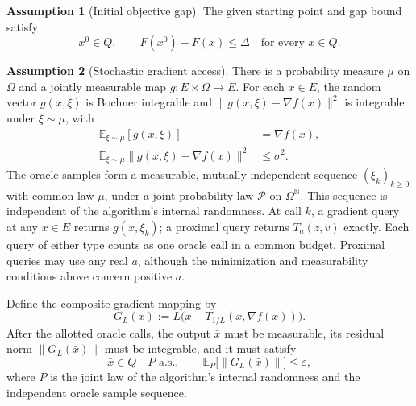 \documentclass[10pt]{article}
\theoremstyle{definition}
\newtheorem{assumption}{Assumption}
\begin{document}
\begin{assumption}[Initial objective gap]
The given starting point and gap bound satisfy
\[
x^0\in Q,
\qquad F(x^0)-F(x)\leq\Delta
\quad\text{for every }x\in Q.
\]
\end{assumption}

\begin{assumption}[Stochastic gradient access]
There is a probability measure $\mu$ on $\Omega$ and a jointly measurable map $g:E\times\Omega\to E$. For each $x\in E$, the random vector $g(x,\xi)$ is Bochner integrable and $\|g(x,\xi)-\nabla f(x)\|^2$ is integrable under $\xi\sim\mu$, with
\[
\begin{aligned}
\mathbb{E}_{\xi\sim\mu}[g(x,\xi)]&=\nabla f(x),\\
\mathbb{E}_{\xi\sim\mu}\|g(x,\xi)-\nabla f(x)\|^2&\leq\sigma^2.
\end{aligned}
\]
The oracle samples form a measurable, mutually independent sequence $(\xi_k)_{k\geq0}$ with common law $\mu$, under a joint probability law $\mathcal{P}$ on $\Omega^{\mathbb{N}}$. This sequence is independent of the algorithm's internal randomness. At call $k$, a gradient query at any $x\in E$ returns $g(x,\xi_k)$; a proximal query returns $T_a(z,v)$ exactly. Each query of either type counts as one oracle call in a common budget. Proximal queries may use any real $a$, although the minimization and measurability conditions above concern positive $a$.
\end{assumption}

Define the composite gradient mapping by
\[
G_L(x):=L\bigl(x-T_{1/L}(x,\nabla f(x))\bigr).
\]
After the allotted oracle calls, the output $\bar{x}$ must be measurable, its residual norm $\|G_L(\bar{x})\|$ must be integrable, and it must satisfy
\[
\bar{x}\in Q\quad P\text{-a.s.},
\qquad
\mathbb{E}_{P}\bigl[\|G_L(\bar{x})\|\bigr]\leq\varepsilon,
\]
where $P$ is the joint law of the algorithm's internal randomness and the independent oracle sample sequence.
\end{document}
